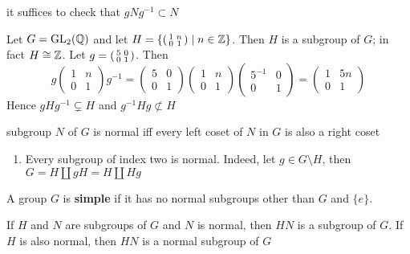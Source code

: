 \documentclass[11pt]{article}
\begin{document}
it suffices to check that \(gNg^{-1}\subset N\)

\begin{examplle}[]
\label{1.33}
Let \(G=\operatorname{GL}_2(\mathbb{Q})\) and let \(H=\{\begin{psmallmatrix}1&n\\0&1\end{psmallmatrix}\mid n\in\mathbb{Z}\}\).
Then \(H\) is a subgroup of \(G\); in fact \(H\cong\mathbb{Z}\).
Let \(g=\begin{psmallmatrix}5&0\\0&1\end{psmallmatrix}\). Then
\begin{equation*}
g
\begin{pmatrix}
1&n\\0&1
\end{pmatrix}g^{-1}=
\begin{pmatrix}
5&0\\0&1
\end{pmatrix}\begin{pmatrix}
1&n\\0&1
\end{pmatrix}
\begin{pmatrix}
5^{-1}&0\\0&1
\end{pmatrix}=
\begin{pmatrix}
1&5n\\0&1
\end{pmatrix}
\end{equation*}
Hence \(gHg^{-1}\subsetneq H\) and \(g^{-1}Hg\not\subset H\)
\end{examplle}

\begin{proposition}[]
subgroup \(N\) of \(G\) is normal iff every left coset of \(N\) in \(G\) is also a right coset
\end{proposition}

\begin{examplle}[]
\begin{enumerate}
\item Every subgroup of index two is normal. Indeed, let \(g\in G\setminus H\), then \(G=H\coprod gH=H\coprod Hg\)
\end{enumerate}
\end{examplle}

A group \(G\) is \textbf{simple} if it has no normal subgroups other than \(G\) and \(\{e\}\).

\begin{proposition}[]
If \(H\) and \(N\) are subgroups of \(G\) and \(N\) is normal, then \(HN\) is a subgroup
of \(G\). If \(H\) is also normal, then \(HN\) is a normal subgroup of \(G\)
\end{proposition}
\end{document}

